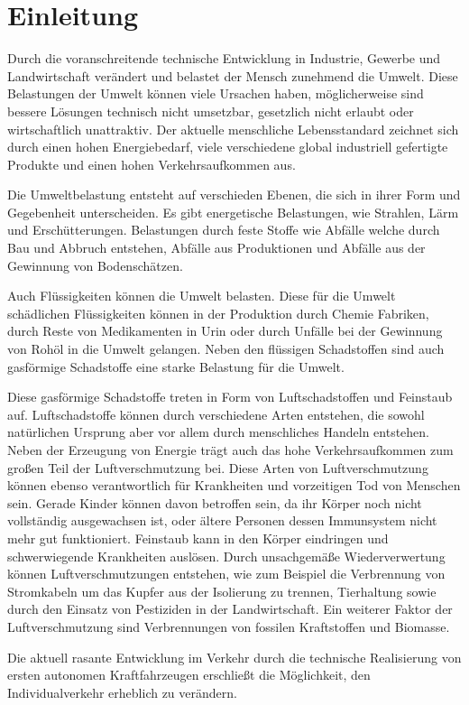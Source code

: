 \chapter{Einleitung}
Durch die voranschreitende technische Entwicklung in Industrie, Gewerbe und Landwirtschaft verändert und belastet der Mensch zunehmend die Umwelt.
Diese Belastungen der Umwelt können viele Ursachen haben,
möglicherweise sind bessere Lösungen technisch nicht umsetzbar,
gesetzlich nicht erlaubt oder wirtschaftlich unattraktiv.
Der aktuelle menschliche Lebensstandard zeichnet sich durch einen
hohen Energiebedarf, viele verschiedene global industriell gefertigte Produkte
und einen hohen Verkehrsaufkommen aus.

Die Umweltbelastung entsteht auf verschieden Ebenen, die sich in ihrer Form und Gegebenheit unterscheiden.
Es gibt energetische Belastungen, wie Strahlen, Lärm und Erschütterungen.
Belastungen durch feste Stoffe wie Abfälle welche durch Bau und Abbruch entstehen,
Abfälle aus Produktionen und
Abfälle aus der Gewinnung von Bodenschätzen.

Auch Flüssigkeiten können die Umwelt belasten.
Diese für die Umwelt schädlichen Flüssigkeiten können
in der Produktion durch Chemie Fabriken,
durch Reste von Medikamenten in Urin oder durch
Unfälle bei der Gewinnung von Rohöl in die Umwelt gelangen.
Neben den flüssigen Schadstoffen sind auch gasförmige Schadstoffe eine starke Belastung für die Umwelt.

Diese gasförmige Schadstoffe treten in Form von Luftschadstoffen und Feinstaub auf.
Luftschadstoffe können durch verschiedene Arten entstehen, die sowohl natürlichen Ursprung aber vor allem
durch menschliches Handeln entstehen.
Neben der Erzeugung von Energie trägt auch das hohe Verkehrsaufkommen zum großen Teil der Luftverschmutzung bei.
Diese Arten von Luftverschmutzung können ebenso verantwortlich für Krankheiten und vorzeitigen Tod von Menschen sein.
Gerade Kinder können davon betroffen sein, da ihr Körper noch nicht vollständig ausgewachsen ist,
oder ältere Personen dessen Immunsystem nicht mehr gut funktioniert.
Feinstaub kann in den Körper eindringen und schwerwiegende Krankheiten auslösen.
Durch unsachgemäße Wiederverwertung können Luftverschmutzungen entstehen,
wie zum Beispiel die Verbrennung von
Stromkabeln um das Kupfer aus der Isolierung zu trennen,
Tierhaltung sowie durch den Einsatz von Pestiziden in der Landwirtschaft.
Ein weiterer Faktor der Luftverschmutzung sind Verbrennungen von fossilen Kraftstoffen und Biomasse.

Die aktuell rasante Entwicklung im Verkehr durch die technische Realisierung von ersten autonomen Kraftfahrzeugen
erschließt die Möglichkeit, den Individualverkehr erheblich zu verändern.

